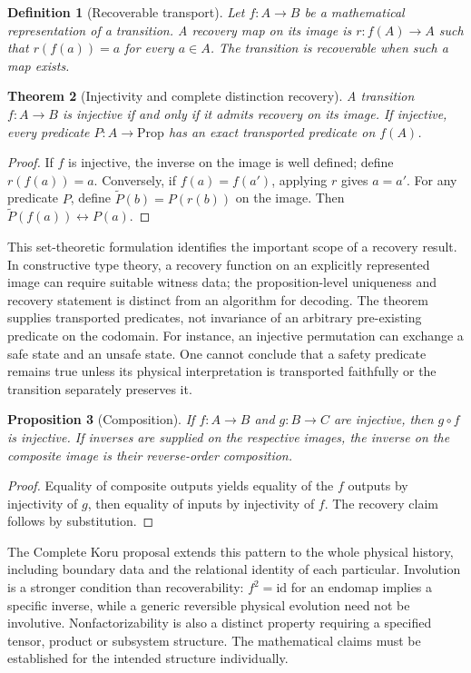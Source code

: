 \documentclass[11pt,a4paper]{article}
\newtheorem{theorem}{Theorem}[section]\newtheorem{proposition}[theorem]{Proposition}\newtheorem{definition}[theorem]{Definition}\newtheorem{example}[theorem]{Example}
\begin{document}
\begin{definition}[Recoverable transport]
Let $f:A\to B$ be a mathematical representation of a transition. A recovery map on its image is $r:f(A)\to A$ such that $r(f(a))=a$ for every $a\in A$. The transition is recoverable when such a map exists.
\end{definition}
\begin{theorem}[Injectivity and complete distinction recovery]\label{thm:inj}
A transition $f:A\to B$ is injective if and only if it admits recovery on its image. If injective, every predicate $P:A\to\mathrm{Prop}$ has an exact transported predicate on $f(A)$.
\end{theorem}
\begin{proof} If $f$ is injective, the inverse on the image is well defined; define $r(f(a))=a$. Conversely, if $f(a)=f(a')$, applying $r$ gives $a=a'$. For any predicate $P$, define $\widetilde P(b)=P(r(b))$ on the image. Then $\widetilde P(f(a))\leftrightarrow P(a)$.\end{proof}
This set-theoretic formulation identifies the important scope of a recovery result. In constructive type theory, a recovery function on an explicitly represented image can require suitable witness data; the proposition-level uniqueness and recovery statement is distinct from an algorithm for decoding. The theorem supplies transported predicates, not invariance of an arbitrary pre-existing predicate on the codomain. For instance, an injective permutation can exchange a safe state and an unsafe state. One cannot conclude that a safety predicate remains true unless its physical interpretation is transported faithfully or the transition separately preserves it.

\begin{proposition}[Composition]
If $f:A\to B$ and $g:B\to C$ are injective, then $g\circ f$ is injective. If inverses are supplied on the respective images, the inverse on the composite image is their reverse-order composition.
\end{proposition}
\begin{proof} Equality of composite outputs yields equality of the $f$ outputs by injectivity of $g$, then equality of inputs by injectivity of $f$. The recovery claim follows by substitution.\end{proof}
The Complete Koru proposal extends this pattern to the whole physical history, including boundary data and the relational identity of each particular. Involution is a stronger condition than recoverability: $f^2=\mathrm{id}$ for an endomap implies a specific inverse, while a generic reversible physical evolution need not be involutive. Nonfactorizability is also a distinct property requiring a specified tensor, product or subsystem structure. The mathematical claims must be established for the intended structure individually.
\end{document}
